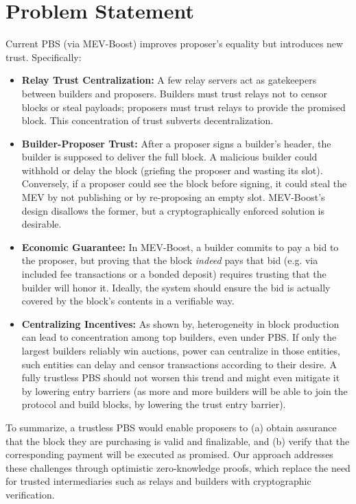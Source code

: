 \section{Problem Statement}
\label{sec:problem}
Current PBS (via MEV-Boost) improves proposer's equality but introduces new trust. Specifically:
\begin{itemize}
    \item \textbf{Relay Trust Centralization:} A few relay servers act as gatekeepers between builders and proposers. Builders must trust relays not to censor blocks or steal payloads; proposers must trust relays to provide the promised block. This concentration of trust subverts decentralization.
    \item \textbf{Builder-Proposer Trust:} After a proposer signs a builder’s header, the builder is supposed to deliver the full block. A malicious builder could withhold or delay the block (griefing the proposer and wasting its slot). Conversely, if a proposer could see the block before signing, it could steal the MEV by not publishing or by re-proposing an empty slot. MEV-Boost’s design disallows the former, but a cryptographically enforced solution is desirable.
    \item \textbf{Economic Guarantee:} In MEV-Boost, a builder commits to pay a bid to the proposer, but proving that the block \emph{indeed} pays that bid (e.g. via included fee transactions or a bonded deposit) requires trusting that the builder will honor it. Ideally, the system should ensure the bid is actually covered by the block’s contents in a verifiable way.
    \item \textbf{Centralizing Incentives:} As shown by, heterogeneity in block production can lead to concentration among top builders, even under PBS. If only the largest builders reliably win auctions, power can centralize in those entities, such entities can delay and censor transactions according to their desire. A fully trustless PBS should not worsen this trend and might even mitigate it by lowering entry barriers (as more and more builders will be able to join the protocol and build blocks, by lowering the trust entry barrier).
\end{itemize}
To summarize, a trustless PBS would enable proposers to (a) obtain assurance that the block they are purchasing is valid and finalizable, and (b) verify that the corresponding payment will be executed as promised. Our approach addresses these challenges through optimistic zero-knowledge proofs, which replace the need for trusted intermediaries such as relays and builders with cryptographic verification.

